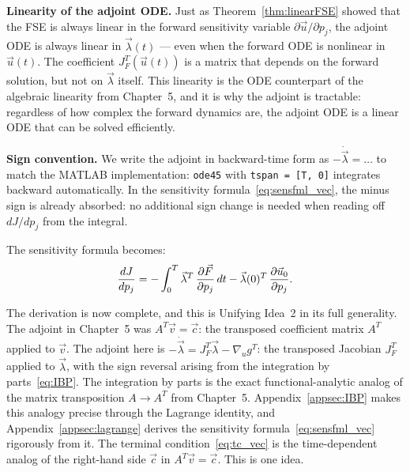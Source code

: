\noindent\textbf{Linearity of the adjoint ODE.}
Just as Theorem~\ref{thm:linearFSE} showed that the FSE is always
linear in the forward sensitivity variable $\partial\vec{u}/\partial p_j$,
the adjoint ODE is always linear in $\vec{\lambda}(t)$ ---
even when the forward ODE is nonlinear in $\vec{u}(t)$.
The coefficient $J_F^T(\vec{u}(t))$ is a matrix that depends on the
forward solution, but not on $\vec{\lambda}$ itself.
This linearity is the ODE counterpart of the algebraic linearity
from Chapter~5, and it is why the adjoint is tractable: regardless
of how complex the forward dynamics are, the adjoint ODE is a
linear ODE that can be solved efficiently.

\medskip\noindent
\textbf{Sign convention.}
We write the adjoint in backward-time form as $-\dot{\vec{\lambda}} = \ldots$
to match the MATLAB implementation: \texttt{ode45} with \texttt{tspan = [T, 0]}
integrates backward automatically.
In the sensitivity formula~\eqref{eq:sensfml_vec},
the minus sign is already absorbed: no additional sign change is needed
when reading off $dJ/dp_j$ from the integral.

The sensitivity formula becomes:
\begin{equation}
  \frac{d J}{d p_j} = -\int_0^T \vec{\lambda}^T\,\frac{\partial \vec{F}}{\partial p_j}\,dt
               - \vec{\lambda}(0)^T\,\frac{\partial \vec{u}_0}{\partial p_j}.
  \label{eq:sensfml_vec}
\end{equation}

 The derivation is now complete, and this is Unifying Idea~2 in its full generality.
The adjoint in Chapter~5 was $A^T\vec{v} = \vec{c}$:
the transposed coefficient matrix $A^T$ applied to $\vec{v}$.
The adjoint here is $-\dot{\vec{\lambda}} = J_F^T\vec{\lambda} - \nabla_u g^T$:
the transposed Jacobian $J_F^T$ applied to $\vec{\lambda}$, with
the sign reversal arising from the integration by parts~\eqref{eq:IBP}.
The integration by parts is the exact functional-analytic analog
of the matrix transposition $A \to A^T$ from Chapter~5.
Appendix~\ref{appsec:IBP} makes this analogy precise through the
Lagrange identity, and Appendix~\ref{appsec:lagrange} derives
the sensitivity formula~\eqref{eq:sensfml_vec} rigorously from it.
The terminal condition~\eqref{eq:tc_vec} is the time-dependent
analog of the right-hand side $\vec{c}$ in $A^T\vec{v} = \vec{c}$.
This is one idea.


